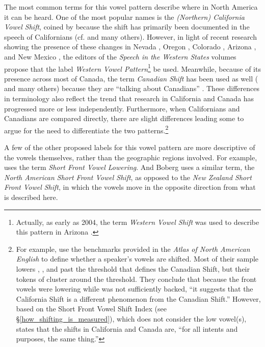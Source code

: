The most common terms for this vowel pattern describe where in North America it can be heard. One of the most popular names is the \textit{(Northern) California Vowel Shift}, coined by \citet{eckert_2008} because the shift has primarily been documented in the speech of Californians (cf. \citealt{hall_lew_etal_2015, janoff_2018, podesva_2011, podesva_etal_2015, villarreal_2016_pads, villarreal_2018} and many others). However, in light of recent research showing the presence of these changes in Nevada \citep{fridland_kendall_2017_pads}, Oregon \citep{conn_2000_diss, nelson_2011, becker_etal_2016_pads, mclarty_etal_2016}, Colorado \citep{holland_brandenburg_2017_pads, holland_2019}, Arizona \citep{hall_lew_etal_2017}, and New Mexico \citep{brumbaugh_koops_2017_pads}, the editors of the \textit{Speech in the Western States} volumes \citep{fridland_etal_2016_pads, fridland_etal_2017_pads} propose that the label \textit{Western Vowel Pattern}\footnote{Actually, as early as 2004, the term \textit{Western Vowel Shift} was used to describe this pattern in Arizona \citep{hall_lew_2004}.} be used. Meanwhile, because of its presence across most of Canada, the term \textit{Canadian Shift} has been used as well  (\citealt{clarke_etal_1995, boberg_2005, sadlier_brown_tamminga_2008, roeder_jarmasz_2010, kettig_2014} and many others) because they are ``talking about Canadians'' \citep{li_etal_2018}. These differences in terminology also reflect the trend that research in California and Canada has progressed more or less independently. Furthermore, when Californians and Canadians are compared directly, there are slight differences \citep{kennedy_grama_2012, hagiwara_2006} leading some to argue for the need to differentiate the two patterns.\footnote{For example, \citet[49]{kennedy_grama_2012} use the benchmarks provided in the \textit{Atlas of North American English} to define whether a speaker’s vowels are shifted. Most of their sample lowers \kit, \dress, and \trap past the threshold that defines the Canadian Shift, but their tokens of \lot cluster around the threshold. They conclude that because the front vowels were lowering while \lot was not sufficiently backed, ``it suggests that the California Shift is a different phenomenon from the Canadian Shift.'' However, based on the Short Front Vowel Shift Index (see \S\ref{how_shifting_is_measured}), which does not consider the low vowel(s), \citet[21]{boberg_2019} states that the shifts in California and Canada are, ``for all intents and purposes, the same thing.''}

A few of the other proposed labels for this vowel pattern are more descriptive of the vowels themselves, rather than the geographic regions involved. For example, \citet{hickey_2018} uses the term \textit{Short Front Vowel Lowering}. And Boberg \citeyearpar{boberg_2019} uses a similar term, the \textit{North American Short Front Vowel Shift}, as opposed to the \textit{New Zealand Short Front Vowel Shift}, in which the vowels move in the opposite direction from what is described here.

